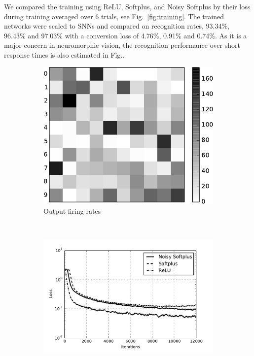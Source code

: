 	We compared the training using ReLU, Softplus, and Noisy Softplus by their loss during training averaged over 6 trials, see Fig.~\ref{fig:training}.
	The trained networks were scaled to SNNs and compared on recognition rates, 93.34\%, 96.43\% and 97.03\% with a conversion loss of 4.76\%, 0.91\% and 0.74\%.
	As it is a major concern in neuromorphic vision, the recognition performance over short response times is also estimated in Fig..
	\begin{figure}[bt!]
		\centering
		\begin{subfigure}[t]{0.5\textwidth}
			\includegraphics[width=\textwidth]{pics_iconip/7.pdf}
		    \caption{Output firing rates}
		    \label{Fig:out}
		\end{subfigure}
		\\
		\begin{subfigure}[t]{0.4\textwidth}
			\includegraphics[width=\textwidth]{pics_iconip/8.pdf}

\end{subfigure}
\end{figure}

